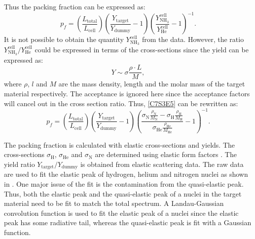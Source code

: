 Thus the packing fraction can be expressed as:
\begin{equation} \label{C7S3E5}
p_f = \left(\frac{L_{\mathrm{total}}}{L_{\mathrm{cell}}}\right)\left(\frac{Y_{\mathrm{target}}}{Y_{\mathrm{dummy}}}-1\right)\left(\frac{Y_{\mathrm{NH_3}}^{\mathrm{cell}}}{Y_{\mathrm{He}}^{\mathrm{cell}}}-1\right)^{-1}.
\end{equation}
It is not possible to obtain the quantity $Y_{\mathrm{NH_3}}^{\mathrm{cell}}$ from the data. However, the ratio $Y_{\mathrm{NH_3}}^{\mathrm{cell}}/Y_{\mathrm{He}}^{\mathrm{cell}}$ could be expressed in terms of the cross-sections since the yield can be expressed as:
\begin{equation} \label{C7S3E6}
Y \sim \sigma\frac{\rho\cdot L}{M},
\end{equation}
where $\rho$, $l$ and $M$ are the mass density, length and the molar mass of the target material respectively. The acceptance is ignored here since the acceptance factors will cancel out in the cross section ratio. Thus, \cref{C7S3E5} can be rewritten as:
\begin{equation} \label{C7S3E7}
p_f = \left(\frac{L_{\mathrm{total}}}{L_{\mathrm{cell}}}\right)\left(\frac{Y_{\mathrm{target}}}{Y_{\mathrm{dummy}}}-1\right)\left(\frac{\sigma_{\mathrm{N}}\frac{\rho_{\mathrm{N}}}{M_{\mathrm{N}}}-\sigma_{\mathrm{H}}\frac{\rho_{\mathrm{H}}}{M_{\mathrm{H}}}}{\sigma_{\mathrm{He}}\frac{\rho_{\mathrm{He}}}{M_{\mathrm{He}}}}-1\right)^{-1}.
\end{equation}

The packing fraction is calculated with elastic cross-sections and yields. The cross-sections $\sigma_{\mathrm{H}}$, $\sigma_{\mathrm{He}}$ and $\sigma_{\mathrm{N}}$ are determined using elastic form factors \cite{Venkat2011,Jager1974}. The yield ratio $Y_{\mathrm{target}}/Y_{\mathrm{dummy}}$ is obtained from elastic scattering data. The raw data are used to fit the elastic peak of hydrogen, helium and nitrogen nuclei as shown in . One major issue of the fit is the contamination from the quasi-elastic peak. Thus, both the elastic peak and the quasi-elastic peak of a nuclei in the target material need to be fit to match the total spectrum. A Landau-Gaussian convolution function is used to fit the elastic peak of a nuclei since the elastic peak has some radiative tail, whereas the quasi-elastic peak is fit with a Gaussian function.

